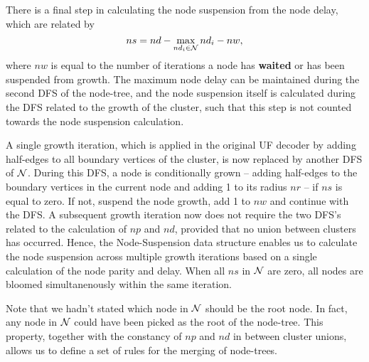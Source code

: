 There is a final step in calculating the node suspension from the node delay, which are related by
\begin{equation}\label{eq:suspension}
    ns = nd - \max_{nd_i \in \nset} nd_i - nw, 
\end{equation}
where $nw$ is equal to the number of iterations a node has \textbf{waited} or has been suspended from growth. The maximum node delay can be maintained during the second DFS of the node-tree, and the node suspension itself is calculated during the DFS related to the growth of the cluster, such that this step is not counted towards the node suspension calculation. 

A single growth iteration, which is applied in the original UF decoder by adding half-edges to all boundary vertices of the cluster, is now replaced by another DFS of $\mathcal{N}$. During this DFS, a node is conditionally grown -- adding half-edges to the boundary vertices in the current node and adding 1 to its radius $nr$ -- if $ns$ is equal to zero. If not, suspend the node growth, add 1 to $nw$ and continue with the DFS. A subsequent growth iteration now does not require the two DFS's related to the calculation of $np$ and $nd$, provided that no union between clusters has occurred. Hence, the Node-Suspension data structure enables us to calculate the node suspension across multiple growth iterations based on a single calculation of the node parity and delay. When all $ns$ in $\mathcal{N}$ are zero, all nodes are bloomed simultanenously within the same iteration. 

Note that we hadn't stated which node in $\mathcal{N}$ should be the root node. In fact, any node in $\mathcal{N}$ could have been picked as the root of the node-tree. This property, together with the constancy of $np$ and $nd$ in between cluster unions, allows us to define a set of rules for the merging of node-trees.  